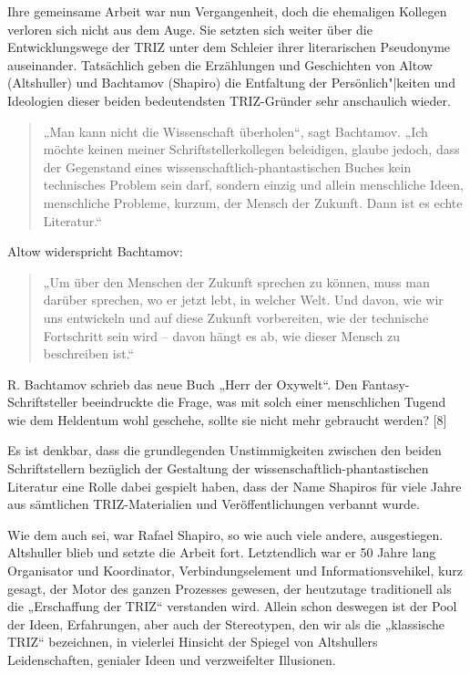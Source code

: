 \documentclass[11pt,a4paper]{article}
\begin{document}
Ihre gemeinsame Arbeit war nun Vergangenheit, doch die ehemaligen Kollegen
verloren sich nicht aus dem Auge. Sie setzten sich weiter über die
Entwicklungswege der TRIZ unter dem Schleier ihrer literarischen Pseudonyme
auseinander. Tatsächlich geben die Erzählungen und Geschichten von Altow
(Altshuller) und Bachtamov (Shapiro) die Entfaltung der Persönlich"|keiten und
Ideologien dieser beiden bedeutendsten TRIZ-Gründer sehr anschaulich wieder.
\begin{quote}
  „Man kann nicht die Wissenschaft überholen“, sagt Bachtamov. „Ich möchte
  keinen meiner Schriftstellerkollegen beleidigen, glaube jedoch, dass der
  Gegenstand eines wissenschaftlich-phantastischen Buches kein technisches
  Problem sein darf, sondern einzig und allein menschliche Ideen, menschliche
  Probleme, kurzum, der Mensch der Zukunft. Dann ist es echte Literatur.“
\end{quote}
Altow widerspricht Bachtamov: 
\begin{quote}
  „Um über den Menschen der Zukunft sprechen zu können, muss man darüber
  sprechen, wo er jetzt lebt, in welcher Welt. Und davon, wie wir uns
  entwickeln und auf diese Zukunft vorbereiten, wie der technische Fortschritt
  sein wird – davon hängt es ab, wie dieser Mensch zu beschreiben ist.“
\end{quote}
R. Bachtamov schrieb das neue Buch „Herr der Oxywelt“. Den
Fantasy-Schriftsteller beeindruckte die Frage, was mit solch einer
menschlichen Tugend wie dem Heldentum wohl geschehe, sollte sie nicht mehr
gebraucht werden? [8]

Es ist denkbar, dass die grundlegenden Unstimmigkeiten zwischen den beiden
Schriftstellern bezüglich der Gestaltung der wissenschaftlich-phantastischen
Literatur eine Rolle dabei gespielt haben, dass der Name Shapiros für viele
Jahre aus sämtlichen TRIZ-Materialien und Veröffentlichungen verbannt wurde.

Wie dem auch sei, war Rafael Shapiro, so wie auch viele andere, ausgestiegen.
Altshuller blieb und setzte die Arbeit fort. Letztendlich war er 50 Jahre lang
Organisator und Koordinator, Verbindungselement und Informationsvehikel, kurz
gesagt, der Motor des ganzen Prozesses gewesen, der heutzutage traditionell
als die „Erschaffung der TRIZ“ verstanden wird. Allein schon deswegen ist der
Pool der Ideen, Erfahrungen, aber auch der Stereotypen, den wir als die
„klassische TRIZ“ bezeichnen, in vielerlei Hinsicht der Spiegel von
Altshullers Leidenschaften, genialer Ideen und verzweifelter Illusionen.
\end{document}
